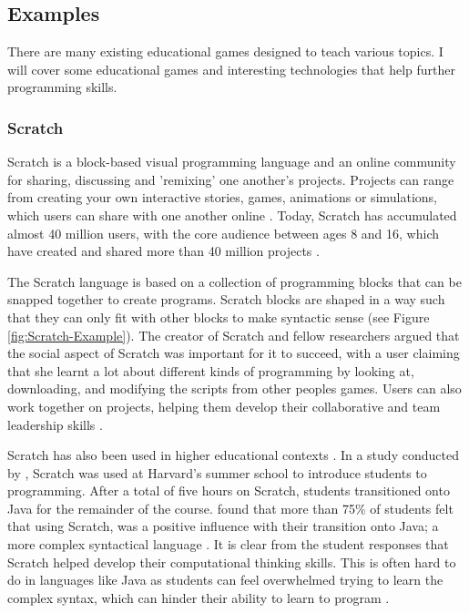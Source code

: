 \documentclass[a4paper,11.5pt]{report}
\numberwithin{figure}{section}
\numberwithin{table}{section}
\numberwithin{equation}{section}
\numberwithin{equation}{section}
\begin{document}
\subsection{Examples}

There are many existing educational games designed to teach various topics. I will cover some educational games and interesting technologies that help further programming skills.

\subsubsection*{Scratch}

Scratch is a block-based visual programming language and an online community for sharing, discussing and 'remixing' one another's projects. Projects can range from creating your own interactive stories, games, animations or simulations, which users can share with one another online \citep{resnick2009}. Today, Scratch has accumulated almost 40 million users, with the core audience between ages 8 and 16, which have created and shared more than 40 million projects \citep{scratchstats}.

The Scratch language is based on a collection of programming blocks that can be snapped together to create programs. Scratch blocks are shaped in a way such that they can only fit with other blocks  to make syntactic sense (see Figure \ref{fig:Scratch-Example}). The creator of Scratch and fellow researchers argued that the social aspect of Scratch was important for it to succeed, with a user claiming that she learnt a lot about different kinds of programming by looking at, downloading, and modifying the scripts from other peoples games. Users can also work together on projects, helping them develop their collaborative and team leadership skills \citep{resnick2009}.



Scratch has also been used in higher educational contexts \citep{resnick2009}. In a study conducted by \citet{malan2007}, Scratch was used at Harvard's summer school to introduce students to programming. After a total of five hours on Scratch, students transitioned onto Java for the remainder of the course. \citeauthor{malan2007} found that more than 75\% of students felt that using Scratch, was a positive influence with their transition onto Java; a more complex syntactical language \citep{malan2007}. It is clear from the student responses that Scratch helped develop their computational thinking skills. This is often hard to do in languages like Java as students can feel overwhelmed trying to learn the complex syntax, which can hinder their ability to learn to program \citep{Koulouri2014}.
\end{document}
